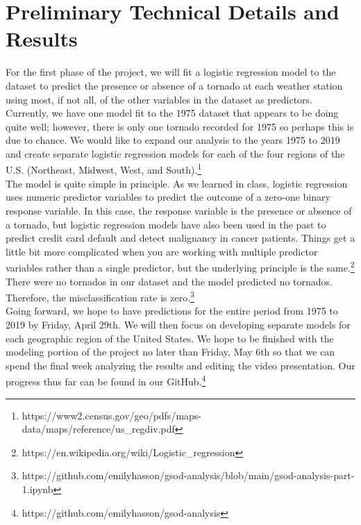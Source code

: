 \documentclass[conference]{IEEEtran}
\begin{document}
\section{Preliminary Technical Details and Results}


For the first phase of the project, we will fit a logistic regression model to the dataset to predict the presence or absence of a tornado at each weather station using most, if not all, of the other variables in the dataset as predictors. Currently, we have one model fit to the 1975 dataset that appears to be doing quite well; however, there is only one tornado recorded for 1975 so perhaps this is due to chance. We would like to expand our analysis to the years 1975 to 2019 and create separate logistic regression models for each of the four regions of the U.S. (Northeast, Midwest, West, and South).\footnote{https://www2.census.gov/geo/pdfs/maps-data/maps/reference/us\_regdiv.pdf} \\

The model is quite simple in principle. As we learned in class, logistic regression uses numeric predictor variables to predict the outcome of a zero-one binary response variable. In this case, the response variable is the presence or absence of a tornado, but logistic regression  models have also been used in the past to predict credit card default and detect malignancy in cancer patients. Things get a little bit more complicated when you are working with multiple predictor variables rather than a single predictor, but the underlying principle is the same.\footnote{https://en.wikipedia.org/wiki/Logistic\_regression} \\

There were no tornados in our dataset and the model predicted no tornados. Therefore, the misclassification rate is zero.\footnote{https://github.com/emilyhasson/gsod-analysis/blob/main/gsod-analysis-part-1.ipynb} \\

Going forward, we hope to have predictions for the entire period from 1975 to 2019 by Friday, April 29th. We will then focus on developing separate models for each geographic region of the United States. We hope to be finished with the modeling portion of the project no later than Friday, May 6th so that we can spend the final week analyzing the results and editing the video presentation. Our progress thus far can be found in our GitHub.\footnote{https://github.com/emilyhasson/gsod-analysis}\\
\end{document}
